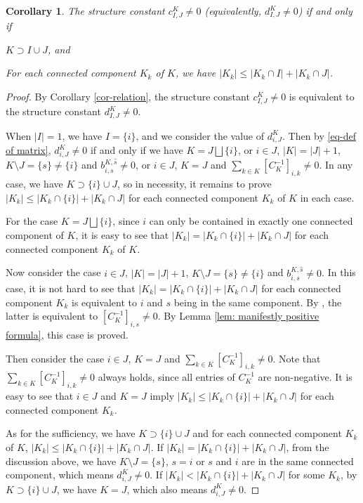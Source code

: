 \documentclass[11pt, letterpaper]{amsart}
\numberwithin{equation}{section}
\newtheorem{corollary}[theorem]{Corollary}
\begin{document}
\begin{corollary} \label{cor-nonzero}
    The structure constant $c_{I,J}^K\neq 0$ (equivalently, $d_{I,J}^K\neq 0$) if and only if 
    \item[$\quad\bullet$] $K \supset I \cup J $, and
    \item[$\quad\bullet$] For each connected component $K_k$ of $K$, we have $|K_k|\leq|K_k\cap I| + |K_k\cap J|$.
\end{corollary}

\begin{proof}
    By Corollary \ref{cor-relation}, the structure constant $c_{I,J}^K\neq 0$ is equivalent to the structure constant $d_{I,J}^K\neq 0$.
    
    When $|I|=1$, we have $I=\{i\}$, and we consider the value of $d_{i,J}^K$. Then by \eqref{eq-def of matrix}, $d_{i,J}^K\neq 0$ if and only if we have $K=J\bigsqcup\{i\}$, or $i\in J$, $|K|=|J|+1$, $K\setminus J=\{s\}\neq\{i\}$ and $b_{i,s}^{K,\widehat{s}}\neq 0$, or $i\in J$, $K=J$ and $\sum_{k\in K}[C_K^{-1}]_{i,k}\neq 0$. In any case, we have $K \supset \{i\}\cup J$, so in necessity, it remains to prove $|K_k|\leq|K_k\cap \{i\}| + |K_k\cap J|$ for each connected component $K_k$ of $K$ in each case.
    
    For the case $K=J\bigsqcup\{i\}$, since $i$ can only be contained in exactly one connected component of $K$, it is easy to see that $|K_k|=|K_k\cap \{i\}| + |K_k\cap J|$ for each connected component $K_k$ of $K$. 
    
    Now consider the case $i\in J$, $|K|=|J|+1$, $K\setminus J=\{s\}\neq\{i\}$ and $b_{i,s}^{K,\widehat{s}}\neq 0$. In this case, it is not hard to see that $|K_k|=|K_k\cap \{i\}| + |K_k\cap J|$ for each connected component $K_k$ is equivalent to $i$ and $s$ being in the same component. By \cite{lusztig1992inverse}, the latter is equivalent to $[C_{K}^{-1}]_{i,s}\neq 0$. By Lemma \ref{lem: manifestly positive formula}, this case is proved.

    Then consider the case $i\in J$, $K=J$ and $\sum_{k\in K}[C_K^{-1}]_{i,k}\neq 0$. Note that $\sum_{k\in K}[C_K^{-1}]_{i,k}\neq 0$ always holds, since all entries of $C_K^{-1}$ are non-negative. It is easy to see that $i\in J$ and $K=J$ imply $|K_k|\le|K_k\cap \{i\}| + |K_k\cap J|$ for each connected component $K_k$.

    As for the sufficiency, we have $K \supset \{i\}\cup J$ and for each connected component $K_k$ of $K$, $|K_k|\leq|K_k\cap \{i\}| + |K_k\cap J|$. If $|K_k|=|K_k\cap \{i\}| + |K_k\cap J|$, from the discussion above, we have $K\setminus J=\{s\}$, $s=i$ or $s$ and $i$ are in the same connected component, which means $d_{i,J}^K\neq 0$. If $|K_k|<|K_k\cap \{i\}| + |K_k\cap J|$ for some $K_k$, by $K\supset \{i\} \cup J$, we have $K=J$, which also means $d_{i,J}^K\neq 0$.


\end{proof}
\end{document}
